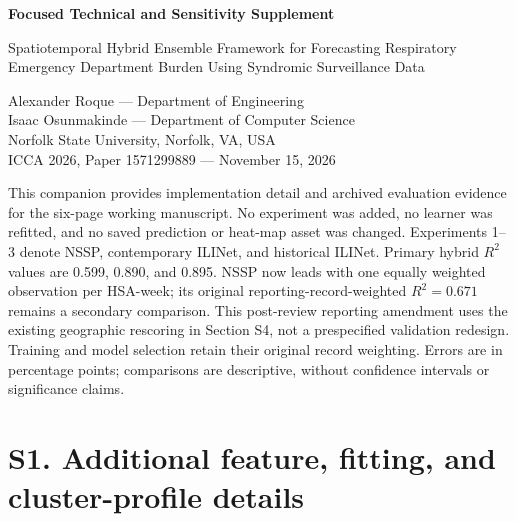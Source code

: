 \documentclass[10pt,a4paper]{article}
\begin{document}
\begin{center}
{\Large\bfseries Focused Technical and Sensitivity Supplement\par}
\medskip
{\large Spatiotemporal Hybrid Ensemble Framework for Forecasting Respiratory Emergency Department Burden Using Syndromic Surveillance Data\par}
\medskip
Alexander Roque --- Department of Engineering\\
Isaac Osunmakinde --- Department of Computer Science\\
Norfolk State University, Norfolk, VA, USA\\
\smallskip ICCA 2026, Paper 1571299889 --- November 15, 2026
\end{center}

\noindent This companion provides implementation detail and archived evaluation evidence for the six-page working manuscript. No experiment was added, no learner was refitted, and no saved prediction or heat-map asset was changed. Experiments 1--3 denote NSSP, contemporary ILINet, and historical ILINet. Primary hybrid $R^2$ values are 0.599, 0.890, and 0.895. NSSP now leads with one equally weighted observation per HSA-week; its original reporting-record-weighted $R^2=0.671$ remains a secondary comparison. This post-review reporting amendment uses the existing geographic rescoring in Section S4, not a prespecified validation redesign. Training and model selection retain their original record weighting. Errors are in percentage points; comparisons are descriptive, without confidence intervals or significance claims.

\section*{S1. Additional feature, fitting, and cluster-profile details}
\label{sec:S1}
\end{document}
